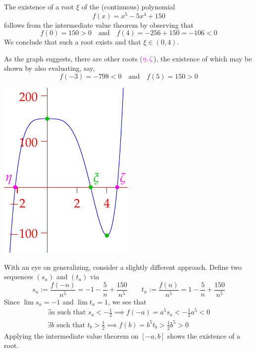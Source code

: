 \begin{examples}{}{}
\begin{enumerate}
		
	\begin{minipage}[t]{0.7\linewidth}\vspace{0pt}
		\item\label{ex:oddpolyroot2} The existence of a root $\xi$ of the (continuous) polynomial
		\[
			f(x)=x^5-5x^4+150
		\]
		follows from the intermediate value theorem by observing that
		\[
			f(0)=150>0\quad\text{and}\quad f(4)=-256+150=-106<0
		\]
		We conclude that such a root exists and that $\xi\in(0,4)$.\par
		As the graph suggests, there are other roots ($\textcolor{Magenta}{\eta,\zeta}$), the existence of which may be shown by also evaluating, say,
		\[
			f(-3)=-798<0\quad\text{and}\quad f(5)=150>0
		\]
	\end{minipage}\begin{minipage}[t]{0.3\linewidth}\vspace{0pt}
		\flushright\includegraphics[scale=0.9]{intval2}
	\end{minipage}
	\smallbreak

		With an eye on generalizing, consider a slightly different approach. Define two sequences $(s_n)$ and $(t_n)$ via
		\[
			s_n:=\frac{f(-n)}{n^5} =-1-\frac{5}n+\frac{150}{n^5}
			\qquad
			t_n:=\frac{f(n)}{n^5}= 1-\frac{5}n+\frac{150}{n^5}
		\]
		Since $\lim s_n=-1$ and $\lim t_n=1$,  we see that
		\begin{gather*}
			\exists a\text{ such that }s_a<-\frac 12\implies f(-a)=a^5s_a<-\frac 12a^5<0\\
			\exists b\text{ such that }t_b>\frac 12\implies f(b)=b^5t_b>\frac 12b^5>0
		\end{gather*}
		Applying the intermediate value theorem on $[-a,b]$ shows the existence of a root.
	\end{enumerate}
\end{examples}

